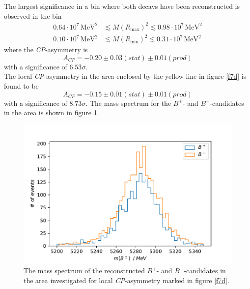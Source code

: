 The largest significance in a bin where both decays have been reconstructed is observed in the bin 
\begin{align*}
  0.64 \cdot 10^{7} \, \si{\mega\eV\squared} &\lesssim M(R_\text{max})^2 \lesssim 0.98\cdot 10^{7} \, \si{\mega\eV\squared} \\
  0.10 \cdot 10^{7} \, \si{\mega\eV\squared} &\lesssim M(R_\text{min})^2 \lesssim 0.31 \cdot 10^{7} \, \si{\mega\eV\squared}
\end{align*}
where the \textit{CP}-asymmetry is 
\begin{equation}
  A_\textit{CP} = -0.20 \pm 0.03(stat)  \pm 0.01(prod)
\end{equation}
with a significance of $6.53 \sigma$. \\
The local \textit{CP}-asymmetry in the area enclosed by the yellow line in figure \ref{f7d} is found to be 
\begin{equation}
  A_\textit{CP} = -0.15  \pm 0.01  (stat)  \pm 0.01(prod)
\end{equation}
with a significance of $8.73 \sigma$. The mass spectrum for the $B^+$- and $B^-$-candidates in the area is shown in figure \ref{f8}. 

\begin{figure}[H]
  \centering
    \includegraphics[width=\textwidth]{plots/num_b.pdf}
  \caption{The mass spectrum of the reconstructed $B^+$- and $B^-$-candidates in the area investigated for local \textit{CP}-asymmetry marked in figure \ref{f7d}.}
  \label{f8}
\end{figure}


